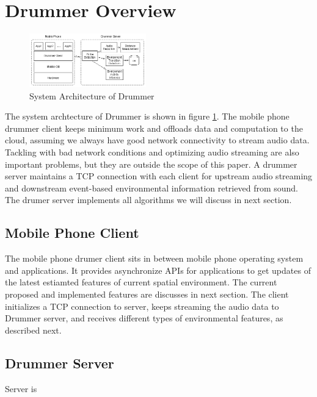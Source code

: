 \section{Drummer Overview}
\label{sec:overview}


\begin{figure}[H]
\centering
\includegraphics[width=0.45\textwidth]{./fig/arch.eps}
\caption{System Architecture of Drummer }
\label{fig:arch}
\end{figure}


The system archtecture of Drummer is shown in figure \ref{fig:arch}. The mobile phone drummer 
client keeps minimum work and offloads data and computation to the cloud, assuming we always
have good network connectivity to stream audio data. Tackling with bad network conditions 
\cite{cuervo2010maui} and optimizing audio streaming \cite{farleycsense} are also important 
problems, but they are outside the scope of this paper. A drummer server maintains a TCP connection
with each client for upstream audio streaming and downstream event-based environmental information
retrieved from sound. The drumer server implements all algorithms we will discuss in next section.


\subsection{Mobile Phone Client}

The mobile phone drumer client sits in between mobile phone operating system and applications.
It provides asynchronize APIs for applications to get updates of the latest estiamted features of
current spatial environment. The current proposed and implemented features are discusses in next section.
The client initializes a TCP connection to server, keeps streaming the audio data to Drummer server, 
and receives different types of environmental features, as described next.



\subsection{Drummer Server}

Server is 